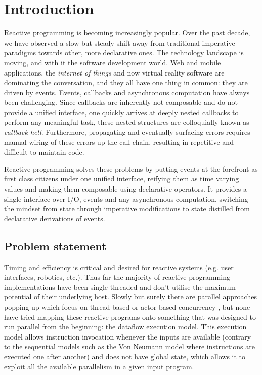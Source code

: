 \chapter{Introduction}

Reactive programming is becoming increasingly popular. Over the past decade, we have observed a slow but steady shift away from traditional imperative paradigms towards other, more declarative ones.
The technology landscape is moving, and with it the software development world. Web and mobile applications, the \textit{internet of things} and now virtual reality software are dominating the conversation, and they all have one thing in common: they are driven by events. Events, callbacks and asynchronous computation have always been challenging. Since callbacks are inherently not composable and do not provide a unified interface, one quickly arrives at deeply nested callbacks to perform any meaningful task, these nested structures are colloquially known as \textit{callback hell}. Furthermore, propagating and eventually surfacing errors requires manual wiring of these errors up the call chain, resulting in repetitive and difficult to maintain code. 

Reactive programming solves these problems by putting events at the forefront as first class citizens under one unified interface, reifying them as time varying values and making them composable using declarative operators. It provides a single interface over I/O, events and any asynchronous computation, switching the mindset from state through imperative modifications to state distilled from declarative derivations of events. 

\section{Problem statement}

Timing and efficiency is critical and desired for reactive systems (e.g. user interfaces, robotics, etc.).
Thus far the majority of reactive programming implementations have been single threaded and don't utilise the maximum potential of their underlying host. Slowly but surely there are parallel approaches popping up which focus on thread based or actor based concurrency \cite{peterson_parallel_2000}, but none have tried mapping these reactive programs onto something that was designed to run parallel from the beginning: the dataflow execution model. This execution model allows instruction invocation whenever the inputs are available (contrary to the sequential models such as the Von Neumann model where instructions are executed one after another) and does not have global state, which allows it to exploit all the available parallelism in a given input program.

